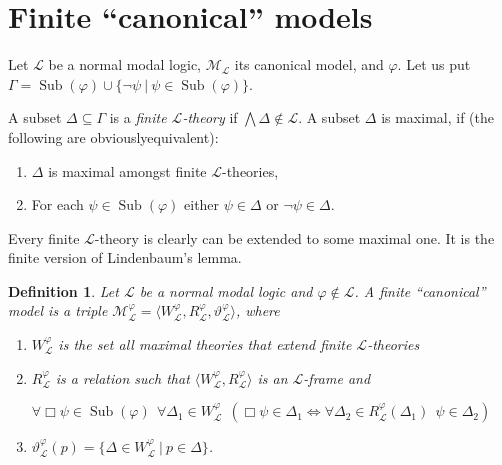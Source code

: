 \documentclass[a4paper]{article}
\theoremstyle{defin}
\newtheorem{defin}{Definition}
\theoremstyle{theorem}
\theoremstyle{prop}
\theoremstyle{lemma}
\theoremstyle{fact}
\theoremstyle{ex}
\theoremstyle{col}
\begin{document}
\section{Finite ``canonical'' models}

Let $\mathcal{L}$ be a normal modal logic, $\mathcal{M}_{\mathcal{L}}$ its canonical model, and $\varphi$. Let us put $\Gamma = \operatorname{Sub}(\varphi) \cup \{ \neg \psi \: | \: \psi \in \operatorname{Sub}(\varphi) \}$.

A subset $\Delta \subseteq \Gamma$ is a \emph{finite $\mathcal{L}$-theory} if $\bigwedge \Delta \notin \mathcal{L}$. A subset $\Delta$ is maximal, if (the following are obviouslyequivalent):
\begin{enumerate}
  \item $\Delta$ is maximal amongst finite $\mathcal{L}$-theories,
  \item For each $\psi \in \operatorname{Sub}(\varphi)$ either $\psi \in \Delta$ or
  $\neg \psi \in \Delta$.
\end{enumerate}

Every finite $\mathcal{L}$-theory is clearly can be extended to some maximal one. It is the finite version of Lindenbaum's lemma.

\begin{defin}
  Let $\mathcal{L}$ be a normal modal logic and $\varphi \not\in \mathcal{L}$. A finite ``canonical'' model is a triple $\mathcal{M}_{\mathcal{L}}^{\varphi} = \langle W_{\mathcal{L}}^{\varphi}, R_{\mathcal{L}}^{\varphi}, \vartheta_{\mathcal{L}}^{\varphi} \rangle$, where
  \begin{enumerate}
    \item $W_{\mathcal{L}}^{\varphi}$ is the set all maximal theories that extend finite $\mathcal{L}$-theories
    \item $R_{\mathcal{L}}^{\varphi}$ is a relation such that
    $\langle W_{\mathcal{L}}^{\varphi}, R_{\mathcal{L}}^{\varphi} \rangle$ is an $\mathcal{L}$-frame
    and
    \begin{center}
    $\forall \Box \psi \in \operatorname{Sub}(\varphi) \:\:
    \forall \Delta_1 \in W_{\mathcal{L}}^{\varphi} \:\: (\Box \psi \in \Delta_1 \Leftrightarrow
    \forall \Delta_2 \in R_{\mathcal{L}}^{\varphi}(\Delta_1) \:\: \psi \in \Delta_2)$
    \end{center}
    \item $\vartheta_{\mathcal{L}}^{\varphi}(p) = \{ \Delta \in W_{\mathcal{L}}^{\varphi} \: | \: p \in \Delta \}$.
  \end{enumerate}
\end{defin}
\end{document}
